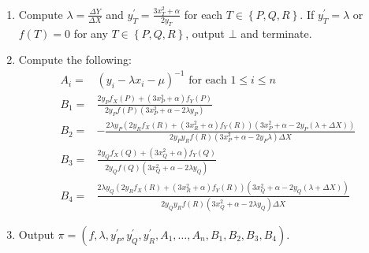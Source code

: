 \documentclass[11pt,letterpaper]{article}
\theoremstyle{definition}
\newcommand{\6}{\mathbf}
\newcommand{\7}{\mathcal}
\begin{document}
\begin{itemize}
\begin{enumerate}
\item \label{prove6} Compute 
$\lambda = \frac{\Delta Y}{\Delta X}$ and 
$y_T^\prime = \frac{3x_T^2+\alpha}{2y_T}$ for each $T \in \left\{P, Q, R\right\}$. If $y_T^\prime = \lambda$  or $f(T) = 0$ for any $T \in \left\{P, Q, R\right\}$, output $\bot$ and terminate.


\item \label{prove7} Compute the following:
\begin{align}
A_i =& (y_i - \lambda x_i - \mu)^{-1}\text{ for each }1 \leq i \leq n  \\
B_1 =& \frac{2y_Pf_X(P) + (3x_P^2+\alpha) f_Y(P)}{2y_Pf(P)(3x_P^2+\alpha - 2\lambda y_P)} \\
B_2 =& - \frac{2\lambda y_P(2y_Rf_X(R) + (3x_R^2+\alpha) f_Y(R))(3x_P^2+\alpha - 2y_P(\lambda + \Delta X))}{2y_Py_Rf(R)(3x_P^2+\alpha-2y_P \lambda )\Delta X} \\
B_3 =& \frac{2y_Qf_X(Q) + (3x_Q^2+\alpha) f_Y(Q)}{2y_Qf(Q)(3x_Q^2+\alpha - 2\lambda y_Q)} \\
B_4 =& \frac{2\lambda y_Q(2y_Rf_X(R) + (3x_R^2+\alpha)f_Y(R))(3x_Q^2+\alpha - 2y_Q(\lambda + \Delta X))}{2y_Qy_Rf(R)(3x_Q^2+\alpha  - 2\lambda y_Q) \Delta X}
\end{align}


\item \label{prove8} Output $\pi = (f,  \lambda, y_P^\prime, y_Q^\prime, y_R^\prime, A_1, \ldots, A_n, B_1, B_2, B_3, B_4)$. 
\end{enumerate}



\end{itemize}
\end{document}
